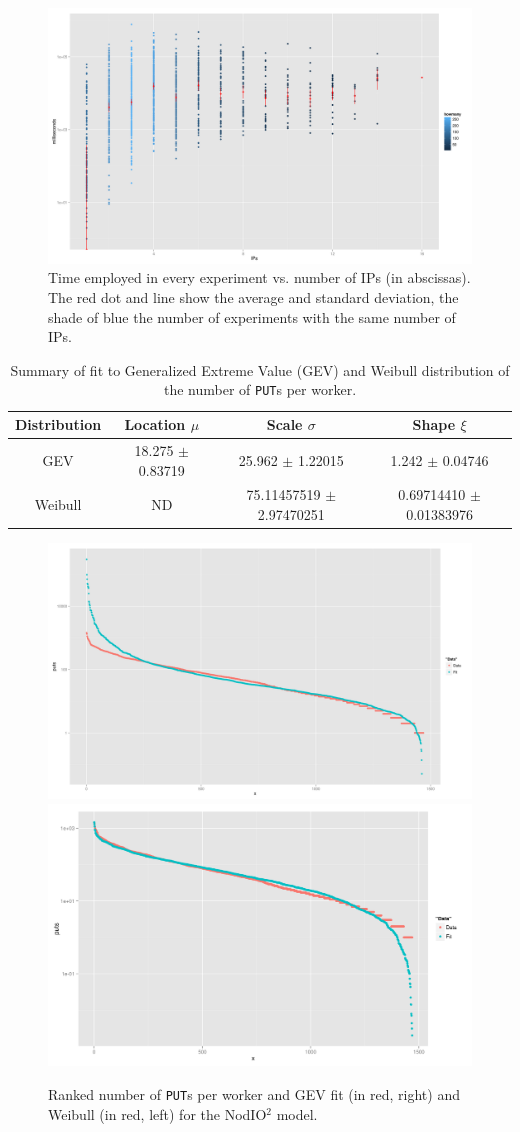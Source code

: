 \documentclass[journal,onecolumn]{IEEEtran}
\begin{document}
\begin{figure}[!htb]
\centering
\includegraphics[width=0.9\linewidth]{img/ips-time-ww.png}
\caption{Time employed in every experiment vs. number of IPs (in abscissas). The red dot and line show the average and standard deviation, the shade of blue the number of experiments with the same number of IPs. }
\label{fig:ipstime:w2}
\end{figure}
%
%
\begin{table}
\caption{Summary of fit to Generalized Extreme Value (GEV) and Weibull distribution of
  the number of {\tt PUT}s per worker. \label{tab:puts:ww}}
\begin{center}
\begin{tabular}{cccc}
\hline
Distribution & Location $\mu$ & Scale $\sigma$ & Shape $\xi$ \\
\hline
GEV & 18.275 $\pm$ 0.83719  &  25.962  $\pm$ 1.22015 & 1.242   $\pm$
0.04746 \\
Weibull & ND & 75.11457519 $\pm$ 2.97470251  & 0.69714410 $\pm$ 0.01383976 \\
\hline
\end{tabular}
\end{center}
\end{table}
%
\begin{figure}[!htb]
\centering
\includegraphics[width=0.49\linewidth]{img/gev-fit-ww.png}
\includegraphics[width=0.49\linewidth]{img/weibull-fit-ww.png}
\caption{Ranked number of {\tt PUT}s per worker and GEV fit (in red, right) and Weibull (in red, left) for the {\sf NodIO$^2$} model.}  
\label{fig:gev:w2}
\end{figure}
\end{document}
